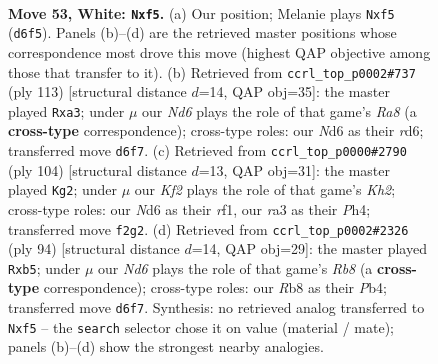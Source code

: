 \documentclass[11pt]{article}
\begin{document}
\clearpage

\begin{figure}[p]\centering
\begin{subfigure}{0.46\textwidth}\centering
\resizebox{\linewidth}{!}{%
\newchessgame
\chessboard[
  setfen={1R6/6pk/3N1p2/5p1p/3P3P/r5P1/5K2/8 w - - 4 53},
  showmover=false,
  pgfstyle=straightmove, color=movearrow, markmove={d6-f5}
]}
\caption{}
\end{subfigure}\hfill
\begin{subfigure}{0.46\textwidth}\centering
\resizebox{\linewidth}{!}{%
\newchessgame
\chessboard[
  setfen={8/7k/3R3p/6pP/3p1p2/P4P2/6PK/r7 b - - 1 57},
  showmover=false,
  pgfstyle=straightmove, color=movearrow, markmove={a1-a3}
]}
\caption{}
\end{subfigure}
\\[4pt]
\begin{subfigure}{0.46\textwidth}\centering
\resizebox{\linewidth}{!}{%
\newchessgame
\chessboard[
  setfen={5R2/6pk/5p2/4p3/4P1PP/5P2/7K/5r2 w - - 5 53},
  showmover=false,
  pgfstyle=straightmove, color=movearrow, markmove={h2-g2}
]}
\caption{}
\end{subfigure}\hfill
\begin{subfigure}{0.46\textwidth}\centering
\resizebox{\linewidth}{!}{%
\newchessgame
\chessboard[
  setfen={1R6/5pk1/6p1/1p5p/1P5P/r5P1/6K1/8 w - - 0 48},
  showmover=false,
  pgfstyle=straightmove, color=movearrow, markmove={b8-b5}
]}
\caption{}
\end{subfigure}
\caption{\textbf{Move 53, White: \texttt{Nxf5}.} (a) Our position; Melanie plays \texttt{Nxf5} (\texttt{d6f5}). Panels (b)--(d) are the retrieved master positions whose correspondence most drove this move (highest QAP objective among those that transfer to it). (b) Retrieved from \texttt{ccrl\_top\_p0002\#737} (ply 113) [structural distance $d$=14, QAP obj=35]: the master played \texttt{Rxa3}; under $\mu$ our \emph{Nd6} plays the role of that game's \emph{Ra8} (a \textbf{cross-type} correspondence); cross-type roles: our \emph{N}d6 as their \emph{r}d6; transferred move \texttt{d6f7}. (c) Retrieved from \texttt{ccrl\_top\_p0000\#2790} (ply 104) [structural distance $d$=13, QAP obj=31]: the master played \texttt{Kg2}; under $\mu$ our \emph{Kf2} plays the role of that game's \emph{Kh2}; cross-type roles: our \emph{N}d6 as their \emph{r}f1, our \emph{r}a3 as their \emph{P}h4; transferred move \texttt{f2g2}. (d) Retrieved from \texttt{ccrl\_top\_p0002\#2326} (ply 94) [structural distance $d$=14, QAP obj=29]: the master played \texttt{Rxb5}; under $\mu$ our \emph{Nd6} plays the role of that game's \emph{Rb8} (a \textbf{cross-type} correspondence); cross-type roles: our \emph{R}b8 as their \emph{P}b4; transferred move \texttt{d6f7}. Synthesis: no retrieved analog transferred to \texttt{Nxf5} -- the \texttt{search} selector chose it on value (material / mate); panels (b)--(d) show the strongest nearby analogies.}
\label{fig:thought-m104}
\end{figure}
\end{document}
